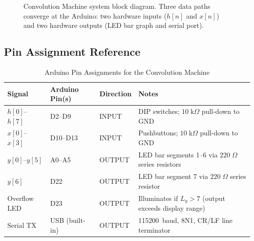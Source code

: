 \documentclass[11pt,letterpaper]{article}
\begin{document}
\begin{figure}[H]
    \centering
    \vspace{0.35in}
    \vspace{0.1in}
    \caption{Convolution Machine system block diagram. Three data paths converge at the Arduino: two hardware inputs ($h[n]$ and $x[n]$) and two hardware outputs (LED bar graph and serial port).}
    \label{fig:block_diagram}
\end{figure}

\subsection{Pin Assignment Reference}

\begin{table}[H]
    \centering
    \caption{Arduino Pin Assignments for the Convolution Machine}
    \label{tab:pins}
    \begin{tabularx}{\linewidth}{l l l X}
    \toprule
    \textbf{Signal} & \textbf{Arduino Pin(s)} & \textbf{Direction} & \textbf{Notes}\\
    \midrule
    $h[0]$--$h[7]$ & D2--D9   & INPUT  & DIP switches; $10\;\mathrm{k}\Omega$ pull-down to GND\\
    $x[0]$--$x[3]$ & D10--D13 & INPUT  & Pushbuttons; $10\;\mathrm{k}\Omega$ pull-down to GND\\
    $y[0]$--$y[5]$ & A0--A5   & OUTPUT & LED bar segments 1--6 via $220\;\Omega$ series resistors\\
    $y[6]$         & D22      & OUTPUT & LED bar segment 7 via $220\;\Omega$ series resistor\\
    Overflow LED   & D23      & OUTPUT & Illuminates if $L_y > 7$ (output exceeds display range)\\
    Serial TX      & USB (built-in) & OUTPUT & 115200~baud, 8N1, CR/LF line terminator\\
    \bottomrule
    \end{tabularx}
\end{table}
\end{document}
